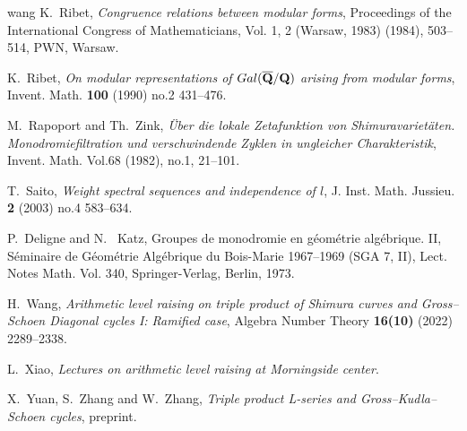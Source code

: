 \documentclass[10pt]{amsart}
\numberwithin{equation}{section}
\theoremstyle{plain}
\numberwithin{equation}{section}
\theoremstyle{definition}
\theoremstyle{remark}
\begin{document}
\begin{thebibliography}{wang}
K.~Ribet, {\em Congruence relations between modular forms}, Proceedings of the {I}nternational {C}ongress of {M}athematicians, {V}ol. 1, 2 ({W}arsaw, 1983) (1984), 503--514, PWN, Warsaw.

K.~Ribet, {\em On modular representations of {${\rm Gal}(\overline{\bf Q}/{\bf Q})$} arising from modular forms}, Invent. Math. {\bf 100} (1990) no.2
 431--476.
 
M.~Rapoport and Th.~Zink, {\em \"{U}ber die lokale {Z}etafunktion von {S}himuravariet\"{a}ten. {M}onodromiefiltration und verschwindende {Z}yklen in
ungleicher {C}harakteristik}, Invent. Math. Vol.68  (1982), no.1, 21--101. 
 
T.~Saito, {\em Weight spectral sequences and independence of $l$}, J. Inst. Math. Jussieu. {\bf 2} (2003) no.4
583--634.

P.~Deligne and N.~ Katz, {Groupes de monodromie en g\'eom\'etrie alg\'ebrique. {II}}, {S{\'e}minaire de G{\'e}om{\'e}trie Alg{\'e}brique du Bois-Marie 1967--1969 (SGA 7, {II})}, {Lect. Notes Math. Vol. 340},  {Springer-Verlag, Berlin}, 1973.

H.~Wang, {\em Arithmetic level raising on triple product of Shimura curves and Gross--Schoen Diagonal cycles I: Ramified case}, Algebra Number Theory {\bf 16(10)} (2022) 2289--2338.

L.~Xiao, {\em Lectures on arithmetic level raising at Morningside center}.

X.~Yuan, S.~Zhang and W.~Zhang, {\em Triple product L-series and Gross--Kudla--Schoen cycles}, preprint. 
 
\end{thebibliography}
\end{document}

